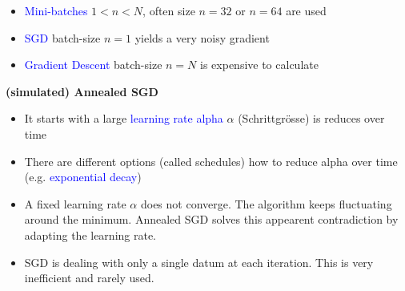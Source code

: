 \begin{itemize}
    \item \textcolor{blue}{Mini-batches} $1<n<N$, often size $n=32$ or $n=64$ are used
    \item \textcolor{blue}{SGD} batch-size $n=1$ yields a very noisy gradient
    \item \textcolor{blue}{Gradient Descent} batch-size $n=N$ is expensive to calculate
\end{itemize}
\vspace{10pt}
\textbf{(simulated) Annealed SGD}

\begin{itemize}
    \item It starts with a large \textcolor{blue}{learning rate alpha} $\alpha$ (Schrittgrösse) is reduces over time
    \item There are different options (called schedules) how to reduce alpha over time (e.g. \textcolor{blue}{exponential decay})
    \item A fixed learning rate $\alpha$ does not converge. The algorithm keeps fluctuating around the minimum. Annealed SGD solves this appearent contradiction by adapting the learning rate.
    \item SGD is dealing with only a single datum at each iteration. This is very inefficient and rarely used.
\end{itemize}
